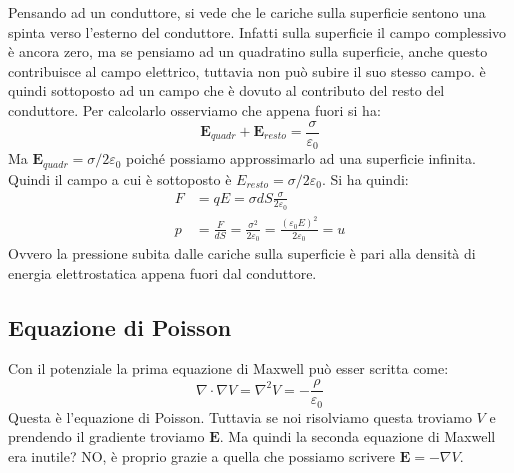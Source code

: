 \documentclass{article}
\renewcommand{\epsilon}{\varepsilon}
\newcommand{\ez}{\epsilon_0}
\newcommand{\mbf}{\mathbf}
\newcommand{\grad}[1][]{\nabla#1}
\renewcommand{\div}[1][]{\nabla#1 \cdot}
\numberwithin{equation}{section}
\begin{document}
Pensando ad un conduttore, si vede che le cariche sulla superficie sentono una spinta verso l'esterno del conduttore. Infatti sulla superficie il campo complessivo è ancora zero, ma se pensiamo ad un quadratino sulla superficie, anche questo contribuisce al campo elettrico, tuttavia non può subire il suo stesso campo. è quindi sottoposto ad un campo che è dovuto al contributo del resto del conduttore. Per calcolarlo osserviamo che appena fuori si ha:
\begin{equation}
    \mbf E_{quadr} + \mbf E_{resto} = \frac{ \sigma }{ \epsilon_0 } 
\end{equation}
Ma $\mbf E_{quadr} = \sigma /2\epsilon_0$ poiché possiamo approssimarlo ad una superficie infinita. Quindi il campo a cui è sottoposto è $E_{resto} = \sigma /2\epsilon_0$. Si ha quindi:
\begin{align}
    F &= qE = \sigma dS \frac{ \sigma }{ 2 \epsilon_0 } \\
    p &= \frac{ F }{ dS } = \frac{ \sigma^2 }{ 2 \epsilon_0 } = \frac{ (\epsilon_0 E)^2 }{ 2 \epsilon_0 } = u
\end{align}
Ovvero la pressione subita dalle cariche sulla superficie è pari alla densità di energia elettrostatica appena fuori dal conduttore.


\subsection{Equazione di Poisson} %
\label{sub:equazione_di_poisson}
Con il potenziale la prima equazione di Maxwell può esser scritta come:
\begin{equation}
    \div \grad V = \nabla^2 V = - \frac{ \rho }{ \ez } 
\end{equation}
Questa è l'equazione di Poisson. Tuttavia se noi risolviamo questa troviamo $V$ e prendendo il gradiente troviamo $\mbf E$. Ma quindi la seconda equazione di Maxwell era inutile? NO, è proprio grazie a quella che possiamo scrivere $\mbf E = - \grad V$. 
\end{document}
